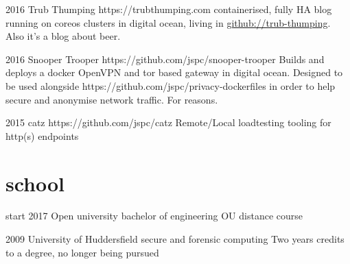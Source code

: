 \documentclass[]{friggeri-cv}
\begin{document}
\begin{entrylist}

\entry
{2016}
{Trub Thumping}
{https://trubthumping.com}
{containerised, fully HA blog running on coreos clusters in digital ocean, living in \href{https://github.com/trub-thumping}{github://trub-thumping}. Also it's a blog about beer.}

\entry
{2016}
{Snooper Trooper}
{https://github.com/jspc/snooper-trooper}
{Builds and deploys a docker OpenVPN and tor based gateway in digital ocean. Designed to be used alongside https://github.com/jspc/privacy-dockerfiles in order to help secure and anonymise network traffic. For reasons.}

\entry
{2015}
{catz}
{https://github.com/jspc/catz}
{Remote/Local loadtesting tooling for http(s) endpoints}

\end{entrylist}

\section{school}

\begin{entrylist}

\entry
{start 2017}
{Open university}
{bachelor of engineering}
{OU distance course}

\entry
{2009}
{University of Huddersfield}
{secure and forensic computing}
{Two years credits to a degree, no longer being pursued}

\end{entrylist}
\end{document}
